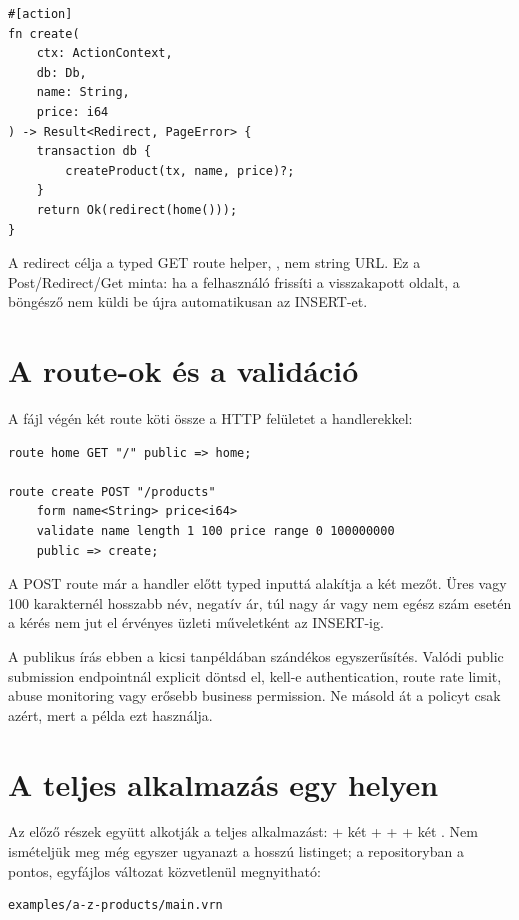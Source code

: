 \begin{lstlisting}[language=Velran]
#[action]
fn create(
    ctx: ActionContext,
    db: Db,
    name: String,
    price: i64
) -> Result<Redirect, PageError> {
    transaction db {
        createProduct(tx, name, price)?;
    }
    return Ok(redirect(home()));
}
\end{lstlisting}

A redirect célja a typed GET route helper, , nem string URL. Ez a Post/Redirect/Get minta: ha a felhasználó frissíti a visszakapott oldalt, a böngésző nem küldi be újra automatikusan az INSERT-et.

\section{A route-ok és a validáció}

A fájl végén két route köti össze a HTTP felületet a handlerekkel:

\begin{lstlisting}[language=Velran]
route home GET "/" public => home;

route create POST "/products"
    form name<String> price<i64>
    validate name length 1 100 price range 0 100000000
    public => create;
\end{lstlisting}

A POST route már a handler előtt typed inputtá alakítja a két mezőt. Üres vagy 100 karakternél hosszabb név, negatív ár, túl nagy ár vagy nem egész szám esetén a kérés nem jut el érvényes üzleti műveletként az INSERT-ig.

A publikus írás ebben a kicsi tanpéldában szándékos egyszerűsítés. Valódi public submission endpointnál explicit döntsd el, kell-e authentication, route rate limit, abuse monitoring vagy erősebb business permission. Ne másold át a  policyt csak azért, mert a példa ezt használja.

\section{A teljes alkalmazás egy helyen}

Az előző részek együtt alkotják a teljes alkalmazást:  + két  +  +  + két . Nem ismételjük meg még egyszer ugyanazt a hosszú listinget; a repositoryban a pontos, egyfájlos változat közvetlenül megnyitható:

\begin{lstlisting}
examples/a-z-products/main.vrn
\end{lstlisting}

